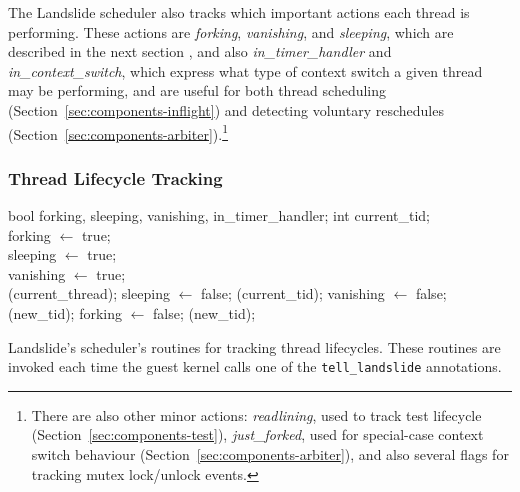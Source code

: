 The Landslide scheduler also tracks which important actions each thread is performing. These actions are {\em forking}, {\em vanishing}, and {\em sleeping}, which are described in the next section , and also {\em in\_timer\_handler} and {\em in\_context\_switch}, which express what type of context switch a given thread may be performing, and are useful for both thread scheduling (Section~\ref{sec:components-inflight}) and detecting voluntary reschedules (Section~\ref{sec:components-arbiter}).\footnote{
There are also other minor actions: {\em readlining}, used to track test lifecycle (Section~\ref{sec:components-test}), {\em just\_forked}, used for special-case context switch behaviour (Section~\ref{sec:components-arbiter}), and also several flags for tracking mutex lock/unlock events.}

\subsubsection{Thread Lifecycle Tracking}

\begin{algorithm}[t]
	\footnotesize
	\begin{algorithmic}
		\State bool forking, sleeping, vanishing, in\_timer\_handler;
		\State int current\_tid;
		\\
			\State forking $\gets$ true;
		\EndFunction
		\\
			\State sleeping $\gets$ true;
		\EndFunction
		\\
			\State vanishing $\gets$ true;
		\EndFunction
		\\
					(current\_thread);
					\State sleeping $\gets$ false;
					(current\_tid);
					\State vanishing $\gets$ false;
					(new\_tid);
					\State forking $\gets$ false;
				\EndIf
			\EndIf
			(new\_tid);
		\EndFunction
	\end{algorithmic}
	\caption{Landslide's scheduler's routines for tracking thread lifecycles. These routines are invoked each time the guest kernel calls one of the \texttt{tell\_landslide} annotations.}
	\label{alg:tell-landslide}
\end{algorithm}

